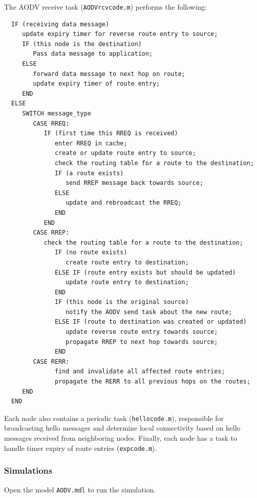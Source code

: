 \documentclass[final,twoside]{rapport}
\begin{document}
The AODV receive task (\texttt{AODVrcvcode.m}) performs the following:

\begin{small} 
\begin{verbatim}
  IF (receiving data message)
     update expiry timer for reverse route entry to source;
     IF (this node is the destination)
        Pass data message to application;
     ELSE
        forward data message to next hop on route;
        update expiry timer of route entry;
     END
  ELSE
     SWITCH message_type
        CASE RREQ:
           IF (first time this RREQ is received)
              enter RREQ in cache;
              create or update route entry to source;
              check the routing table for a route to the destination;
              IF (a route exists)
                 send RREP message back towards source;
              ELSE
                 update and rebroadcast the RREQ;
              END
           END
        CASE RREP:
           check the routing table for a route to the destination;
              IF (no route exists)
                 create route entry to destination;
              ELSE IF (route entry exists but should be updated)
                 update route entry to destination;
              END
              IF (this node is the original source)
                 notify the AODV send task about the new route;
              ELSE IF (route to destination was created or updated)
                 update reverse route entry towards source;
                 propagate RREP to next hop towards source;
              END
        CASE RERR:
              find and invalidate all affected route entries;
              propagate the RERR to all previous hops on the routes;
     END
  END
\end{verbatim}
\end{small} 

Each node also contains a periodic task (\texttt{hellocode.m}),
responsible for broadcasting hello messages and determine local
connectivity based on hello messages received from neighboring nodes.
Finally, each node has a task to handle timer expiry of route entries
(\texttt{expcode.m}).



\subsubsection{Simulations}

Open the model \texttt{AODV.mdl} to run the simulation. 
\end{document}
